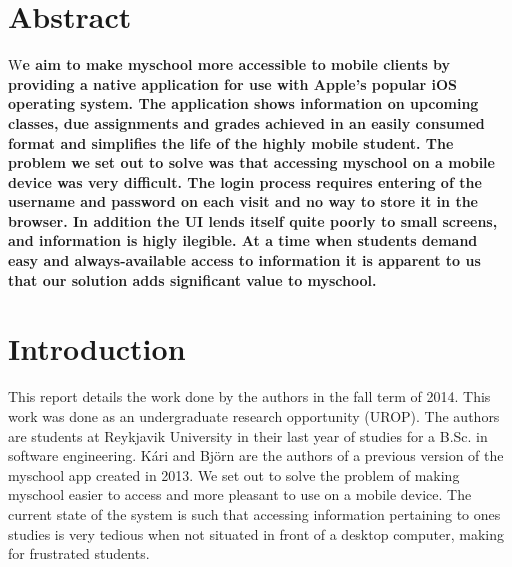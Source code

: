\documentclass[pdftex, DIV=calc, paper=a4, fontsize=11pt, twocolumn]{scrartcl}	 %
\newcommand{\initial}[1]{ %
\lettrine[lines=3,lhang=0.3,nindent=0em]{
\color{DarkGray}
{\textsf{#1}}}{}}
\begin{document}


\thispagestyle{fancy} %
\setcounter{page}{1}

\section*{Abstract}
\initial{W}\textbf{e aim to make myschool more accessible to mobile clients by providing a native 
    application for use with Apple's popular iOS operating system. The application shows information
on upcoming classes, due assignments and grades achieved in an easily consumed format and simplifies
the life of the highly mobile student. The problem we set out to solve was that accessing myschool 
on a mobile device was very difficult. The login process requires entering of the username and 
password on each visit and no way to store it in the browser. In addition the UI lends itself quite
poorly to small screens, and information is higly ilegible. At a time when students demand easy
and always-available access to information it is apparent to us that our solution adds significant
value to myschool.}


\section*{Introduction}

This report details the work done by the authors in the fall term of 2014. This work was done
as an undergraduate research opportunity (UROP). The authors are students at Reykjavik University
in their last year of studies for a B.Sc. in software engineering. Kári and Björn are the authors
of a previous version of the myschool app created in 2013. We set out to solve the problem of 
making myschool easier to access and more pleasant to use on a mobile device. The current state
of the system is such that accessing information pertaining to ones studies is very tedious when not
situated in front of a desktop computer, making for frustrated students. 
\end{document}
